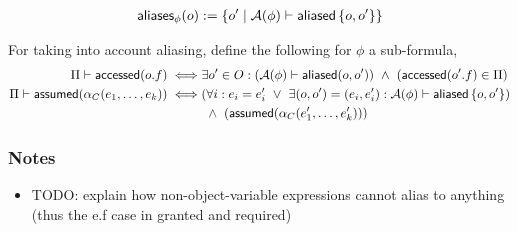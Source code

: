 \begin{align*}
\textsf{aliases}_\phi(o) := \left\{  o^\prime \mid \mathcal{A}(\phi) \vdash \textsf{aliased}\left\{ o, o^\prime \right\}  \right\}
\end{align*}

\noindent
For taking into account aliasing, define the following for $\phi$ a sub-formula,
\begin{align*}
\Pi \vdash \textsf{accessed}(o.f) \iff &
  \exists o^\prime \in O :
  (\mathcal{A}(\phi) \vdash \textsf{aliased}(o, o^\prime)) \ \land \
  (\textsf{accessed}(o^\prime.f) \in \Pi)
\\
\Pi \vdash \textsf{assumed}(\alpha_C(e_1, \dots, e_k)) \iff &
  (\forall i :
    e_i = e^\prime_i
    \ \lor \
    \exists (o, o^\prime) = (e_i, e^\prime_i) : \mathcal{A}(\phi) \vdash \textsf{aliased}\left\{ o, o^\prime \right\}
  )
  \\ & \ \land \
  (\textsf{assumed}(\alpha_C(e^\prime_1, \dots, e^\prime_k)))
\end{align*}


\subsubsection{Notes}

\begin{itemize}
  \item TODO: explain how non-object-variable expressions cannot alias to anything (thus the e.f case in granted and required)
\end{itemize}
